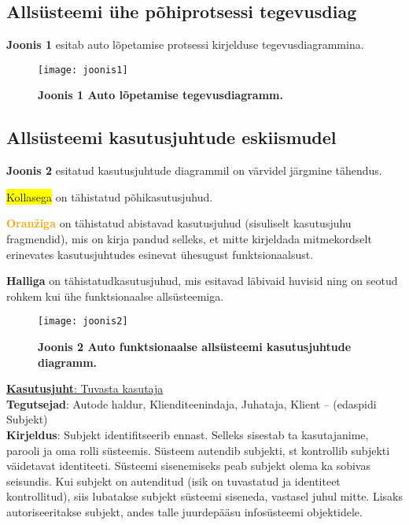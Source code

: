 \subsection{Allsüsteemi ühe põhiprotsessi tegevusdiag}

\textbf{Joonis 1} esitab auto lõpetamise protsessi kirjelduse tegevusdiagrammina. 
\begin{figure}[H]
	\texttt{[image: joonis1]}
	\caption{\textbf{Joonis 1 Auto lõpetamise tegevusdiagramm.}}
\end{figure}

\subsection{Allsüsteemi kasutusjuhtude eskiismudel}
\textbf{Joonis 2} esitatud kasutusjuhtude diagrammil on värvidel järgmine tähendus.

\begin{myitemize}
	\item \colorbox{yellow}{Kollasega} on tähistatud põhikasutusjuhud.
	\item \textbf{\textcolor{orange}{Oranžiga}} on tähistatud abistavad kasutusjuhud (sisuliselt kasutusjuhu fragmendid), mis on kirja pandud selleks, et mitte kirjeldada mitmekordselt erinevates kasutusjuhtudes esinevat ühesugust funktsionaalsust.
	\item \textbf{\colorbox{light-gray}{Halliga}} on tähistatudkasutusjuhud, mis esitavad läbivaid huvisid ning on seotud rohkem kui ühe funktsionaalse allsüsteemiga.
\end{myitemize}

\begin{figure}[H]
	\texttt{[image: joonis2]}
	\caption{\textbf{Joonis 2 Auto funktsionaalse allsüsteemi kasutusjuhtude diagramm.}}
\end{figure}

\begin{flushleft}
\underline{\textbf{Kasutusjuht}: Tuvasta kasutaja} \\
\textbf{Tegutsejad}: Autode haldur, Klienditeenindaja, Juhataja, Klient – (edaspidi Subjekt) \\
\textbf{Kirjeldus}: Subjekt identifitseerib ennast. Selleks sisestab ta kasutajanime, parooli ja oma rolli süsteemis. Süsteem autendib subjekti, st kontrollib subjekti väidetavat identiteeti. Süsteemi sisenemiseks peab subjekt olema ka sobivas seisundis. Kui subjekt on autenditud (isik on tuvastatud ja identiteet kontrollitud), siis lubatakse subjekt süsteemi siseneda, vastasel juhul mitte. Lisaks autoriseeritakse subjekt, andes talle juurdepääsu infosüsteemi objektidele.
\end{flushleft}

